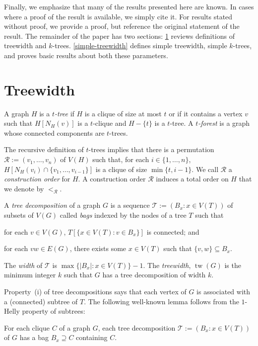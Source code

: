 \documentclass[kpfonts]{patmorin}
\DeclareMathOperator{\tw}{tw}
\theoremstyle{named}
\begin{document}
Finally, we emphasize that many of the results presented here are known. In cases where a proof of the result is available, we simply cite it.  For results stated without proof, we provide a proof, but reference the original statement of the result.  The remainder of the paper has two sections: \cref{treewidth} reviews definitions of treewidth and $k$-trees. \cref{simple-treewidth} defines simple treewidth, simple $k$-trees, and proves basic results about both these parameters.


\section{Treewidth}
\label{treewidth}

A graph $H$ is a \emph{$t$-tree} if $H$ is a clique of size at most $t$ or if it contains a vertex $v$ such that $H[N_H(v)]$ is a $t$-clique and $H-\{t\}$ is a $t$-tree.  A \emph{$t$-forest} is a graph whose connected components are $t$-trees.

The recursive definition of $t$-trees implies that there is a permutation $\mathcal{R}:=(v_1,\ldots,v_n)$ of $V(H)$ such that, for each $i\in\{1,\ldots,n\}$, $H[N_H(v_i)\cap \{v_1,\ldots,v_{i-1}\}]$ is a clique of size $\min\{t,i-1\}$.  We call $\mathcal{R}$ a \emph{construction order} for $H$.  A construction order $\mathcal{R}$ induces a total order on $H$ that we denote by $<_{\mathcal{R}}$.

A \emph{tree decomposition} of a graph $G$ is a sequence $\mathcal{T}:=(B_x:x\in V(T))$ of subsets of $V(G)$ called \emph{bags} indexed by the nodes of a tree $T$ such that
 \begin{inparaenum}[(i)]
     \item for each $v\in V(G)$, $T[\{x\in V(T):v\in B_x\}]$ is connected; and
     \item for each $vw\in E(G)$, there exists some $x\in V(T)$ such that $\{v,w\}\subseteq B_x$.
\end{inparaenum}
The \emph{width} of $\mathcal{T}$ is $\max\{|B_x|:x\in V(T)\}-1$.  The \emph{treewidth}, $\tw(G)$ is the minimum integer $k$ such that $G$ has a tree decomposition of width $k$.

Property~(i) of tree decompositions says that each vertex of $G$ is associated with a (connected) subtree of $T$.  The following well-known lemma follows from the $1$-Helly property of subtrees:

\begin{lem}
\label{TreeDecompositionClique}
    For each clique $C$ of a graph $G$, each tree decomposition $\mathcal{T}:=(B_x:x\in V(T))$ of $G$ has a bag $B_x\supseteq C$ containing $C$.
\end{lem}
\end{document}
